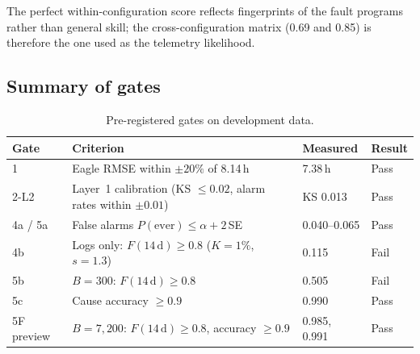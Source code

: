 \documentclass[10pt,a4paper]{article}
\begin{document}
The perfect within-configuration score reflects fingerprints of the fault programs rather than general skill; the cross-configuration matrix (0.69 and 0.85) is therefore the one used as the telemetry likelihood.

\subsection{Summary of gates}
\begin{table}[H]
\centering
\caption{Pre-registered gates on development data.}
\label{tab:gates}
\small
\begin{tabularx}{\textwidth}{@{}lXll@{}}
\toprule
Gate & Criterion & Measured & Result\\
\midrule
1 & Eagle RMSE within $\pm 20\%$ of 8.14\,h & 7.38\,h & Pass\\
2-L2 & Layer~1 calibration (KS $\le 0.02$, alarm rates within $\pm 0.01$) & KS 0.013 & Pass\\
4a / 5a & False alarms $P(\text{ever}) \le \alpha + 2$\,SE & 0.040--0.065 & Pass\\
4b & Logs only: $F(14\,\mathrm d) \ge 0.8$ ($K = 1\%$, $s = 1.3$) & 0.115 & Fail\\
5b & $B = 300$: $F(14\,\mathrm d) \ge 0.8$ & 0.505 & Fail\\
5c & Cause accuracy $\ge 0.9$ & 0.990 & Pass\\
5F preview & $B = 7{,}200$: $F(14\,\mathrm d) \ge 0.8$, accuracy $\ge 0.9$ & 0.985, 0.991 & Pass\\
\bottomrule
\end{tabularx}
\end{table}

\end{document}
